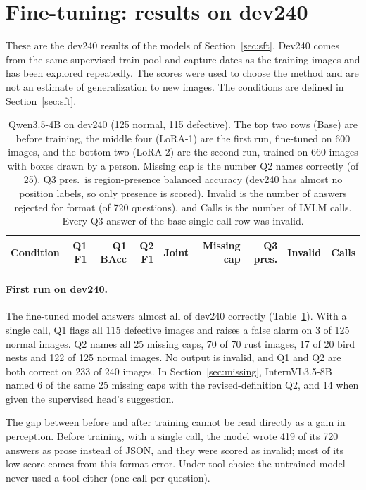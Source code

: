 \documentclass[11pt]{article}
\begin{document}
\section{Fine-tuning: results on dev240}
These are the dev240 results of the models of Section~\ref{sec:sft}. Dev240 comes from the same supervised-train pool and capture dates as the training images and has been explored repeatedly. The scores were used to choose the method and are not an estimate of generalization to new images. The conditions are defined in Section~\ref{sec:sft}.

\begin{table}[t]
\centering
\caption{Qwen3.5-4B on dev240 (125 normal, 115 defective). The top two rows (Base) are before training, the middle four (LoRA-1) are the first run, fine-tuned on 600 images, and the bottom two (LoRA-2) are the second run, trained on 660 images with boxes drawn by a person. Missing cap is the number Q2 names correctly (of 25). Q3 pres.\ is region-presence balanced accuracy (dev240 has almost no position labels, so only presence is scored). Invalid is the number of answers rejected for format (of 720 questions), and Calls is the number of LVLM calls. Every Q3 answer of the base single-call row was invalid.}
\label{tab:sft}
\small
\begin{tabular}{lrrrrrrrr}
\toprule
Condition & Q1 F1 & Q1 BAcc & Q2 F1 & Joint & Missing cap & Q3 pres. & Invalid & Calls \\
\midrule

\bottomrule
\end{tabular}
\end{table}

\paragraph{First run on dev240.} The fine-tuned model answers almost all of dev240 correctly (Table~\ref{tab:sft}). With a single call, Q1 flags all 115 defective images and raises a false alarm on 3 of 125 normal images. Q2 names all 25 missing caps, 70 of 70 rust images, 17 of 20 bird nests and 122 of 125 normal images. No output is invalid, and Q1 and Q2 are both correct on 233 of 240 images. In Section~\ref{sec:missing}, InternVL3.5-8B named 6 of the same 25 missing caps with the revised-definition Q2, and 14 when given the supervised head's suggestion.

The gap between before and after training cannot be read directly as a gain in perception. Before training, with a single call, the model wrote 419 of its 720 answers as prose instead of JSON, and they were scored as invalid; most of its low score comes from this format error. Under tool choice the untrained model never used a tool either (one call per question).
\end{document}

